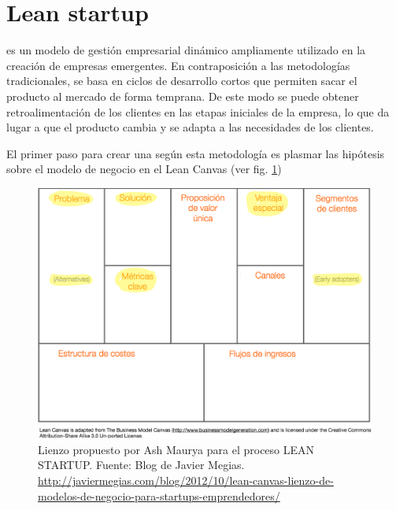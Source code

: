 \section{Lean startup}

 es un modelo de gestión empresarial dinámico ampliamente utilizado en la creación de empresas emergentes. En contraposición a las metodologías tradicionales,   se basa en ciclos de desarrollo cortos que permiten sacar el producto al mercado de forma temprana. De este modo se puede obtener retroalimentación de los clientes en las etapas iniciales de la empresa, lo que da lugar a que el producto cambia y se adapta a las necesidades de los clientes.

El primer paso para crear una  según esta metodología es plasmar las hipótesis sobre el modelo de negocio en el Lean Canvas (ver fig. \ref{leanCanvas})


\begin{figure}[H]
\begin{center}
\includegraphics[scale=0.25]{imagenes/lienzo_lean_canvas.png}
\caption{Lienzo propuesto por Ash Maurya para el proceso LEAN STARTUP. Fuente: Blog de Javier Megias. \url{http://javiermegias.com/blog/2012/10/lean-canvas-lienzo-de-modelos-de-negocio-para-startups-emprendedores/} }
\label{leanCanvas}
\end{center}
\end{figure}

